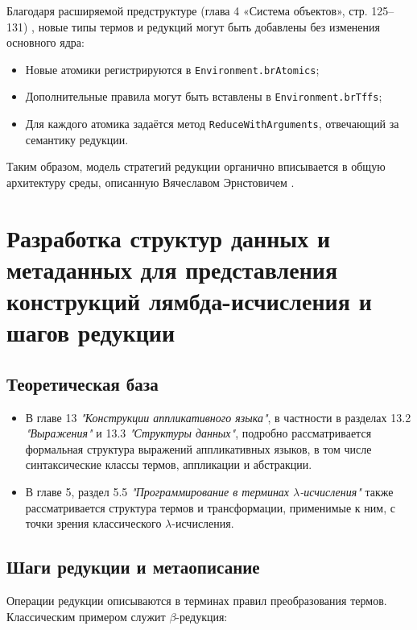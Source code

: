 Благодаря расширяемой предструктуре (глава 4 «Система объектов», стр. 125–131) \cite{Wolfengagen2004}, новые типы термов и редукций могут быть добавлены без изменения основного ядра:

\begin{itemize}
  \item Новые атомики регистрируются в \verb|Environment.brAtomics|;
  \item Дополнительные правила могут быть вставлены в \verb|Environment.brTffs|;
  \item Для каждого атомика задаётся метод \verb|ReduceWithArguments|, отвечающий за семантику редукции.
\end{itemize}

Таким образом, модель стратегий редукции органично вписывается в общую архитектуру среды, описанную Вячеславом Эрнстовичем \cite{Wolfengagen2004}.

\section{Разработка структур данных и метаданных для представления конструкций лямбда-исчисления и шагов редукции}
\label{sec:lambda-structures}


\subsection*{Теоретическая база}

\begin{itemize}
  \item В главе 13 \textit{"Конструкции аппликативного языка"}, в частности в разделах 13.2 \textit{"Выражения"} и 13.3 \textit{"Структуры данных"}, подробно рассматривается формальная структура выражений аппликативных языков, в том числе синтаксические классы термов, аппликации и абстракции\cite{Wolfengagen2004}.
  \item В главе 5, раздел 5.5 \textit{"Программирование в терминах $\lambda$-исчисления"} также рассматривается структура термов и трансформации, применимые к ним, с точки зрения классического $\lambda$-исчисления\cite{Wolfengagen2004}.
\end{itemize}


\subsection*{Шаги редукции и метаописание}

Операции редукции описываются в терминах правил преобразования термов. Классическим примером служит $\beta$-редукция:

